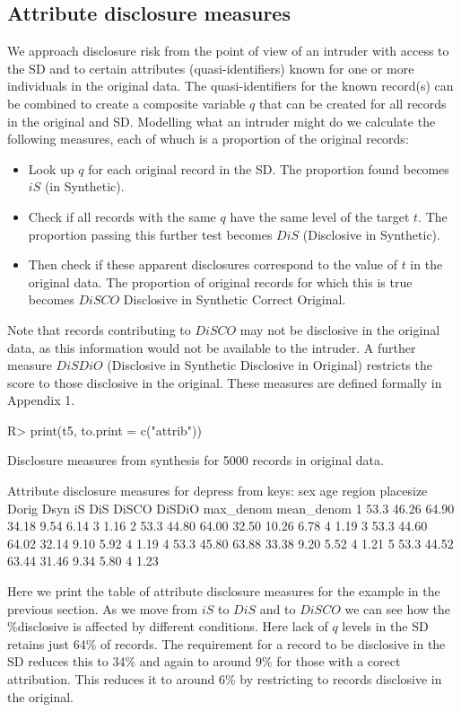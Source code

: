 \documentclass[12pt]{article}
\renewcommand{\baselinestretch}{1.5} %
\begin{document}
\subsection{Attribute disclosure measures}\label{subsec:attrib} 
We approach disclosure risk from the point of view of an intruder with access to the SD
and to certain attributes (quasi-identifiers) known for one or more individuals in the original data.
The quasi-identifiers for the known record(s) can be combined to create a composite variable $q$ that can be created for all records in the original and SD.
Modelling what an intruder might do we calculate the following measures, each of whuch is a proportion of the original records:
\begin{itemize}
\item{Look up $q$ for each original record in the SD. The proportion found becomes $iS$ (in Synthetic).}
\item{Check if all records with the same $q$ have the same level of the target $t$. The proportion passing this further test becomes $DiS$ (Disclosive in Synthetic).}
\item{Then check if these apparent disclosures correspond to the value of $t$ in the original data. The proportion of original records for which this is true
becomes $DiSCO$ Disclosive in Synthetic Correct Original.}
\end{itemize}
Note that records contributing to $DiSCO$ may not be disclosive in the original data, as this information would not be available to the intruder. A further measure $DiSDiO$ (Disclosive in Synthetic Disclosive in Original) restricts the score to those disclosive in the original. These measures are defined formally in Appendix 1.
\renewcommand{\baselinestretch}{1.0}
\begin{Schunk}
\begin{Sinput}
R> print(t5, to.print = c("attrib"))
\end{Sinput}
\begin{Soutput}
Disclosure measures from synthesis for 5000 records in original data.

Attribute disclosure measures for depress from keys: sex age region placesize 
  Dorig  Dsyn    iS   DiS DiSCO DiSDiO max_denom mean_denom
1  53.3 46.26 64.90 34.18  9.54   6.14         3       1.16
2  53.3 44.80 64.00 32.50 10.26   6.78         4       1.19
3  53.3 44.60 64.02 32.14  9.10   5.92         4       1.19
4  53.3 45.80 63.88 33.38  9.20   5.52         4       1.21
5  53.3 44.52 63.44 31.46  9.34   5.80         4       1.23
\end{Soutput}
\end{Schunk}
\renewcommand{\baselinestretch}{1.5}
Here we print the table of attribute disclosure measures for the example 
in the previous section.
As we move from $iS$ to $DiS$ and to $DiSCO$  we can see how the \%disclosive is affected by different conditions. Here lack of $q$ levels in the SD retains just 64\% of records. The requirement for a record to be disclosive in
the SD reduces this to 34\% and again to around 9\% for those with a corect attribution. This reduces it to around 6\% by restricting to 
records disclosive in the original.
\end{document}
